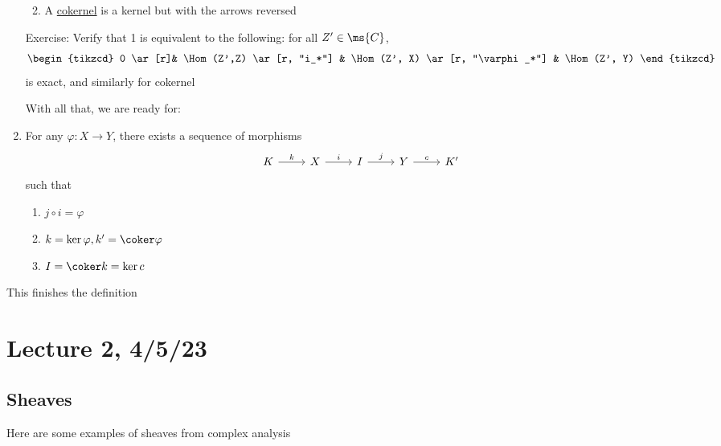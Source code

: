 \documentclass[x11names,reqno,14pt]{extarticle}
\begin{document}
\begin{enumerate}
\begin{enumerate}
\begin{enumerate}[label=(\alph*)]
\end{enumerate}

\item A \underline{cokernel} is a kernel but with the arrows reversed

\end{enumerate}

Exercise: Verify that 1 is equivalent to the following: for all $Z'\in\ms{C}$, 
\[
\begin{tikzcd}
0 \ar[r]& \Hom(Z',Z) \ar[r, "i_*"] & \Hom(Z', X) \ar[r, "\varphi_*"] & \Hom(Z', Y) 
\end{tikzcd}
\]
is exact, and similarly for cokernel

With all that, we are ready for: 

\item For any $\varphi:X\to Y$, there exists a sequence of morphisms 
\[
\begin{tikzcd}
K\ar[r, "k"] & X \ar[r, "i"] & I \ar[r, "j"] & Y \ar[r, "c"] & K'
\end{tikzcd}
\]
such that
\begin{enumerate}[label=(\alph*)]

\item $j\circ i = \varphi$

\item $k = \ker \varphi, k' = \coker\varphi$

\item $I = \coker k = \ker c$

\end{enumerate}

\end{enumerate}

This finishes the definition

\section*{Lecture 2, 4/5/23}

\subsection*{Sheaves}

Here are some examples of sheaves from complex analysis

\exm\,
\end{document}

